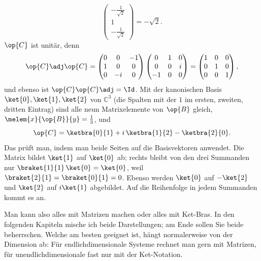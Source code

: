 \begin{example}
\begin{equation}
      \begin{pmatrix} -\frac{1}{\sqrt{2}} \\ 1 \\ -\frac{1}{\sqrt{2}} \end{pmatrix}
    = -\sqrt{2} .
  \end{equation}
  $\op{C}$ ist unitär, denn
  \begin{equation}\label{c03.eq.c-unitaer}
    \op{C}\adj\op{C}
    = \begin{pmatrix} 0 & 0 & -1 \\ 1 & 0 & 0 \\ 0 & -i & 0 \end{pmatrix}
      \begin{pmatrix} 0 & 1 & 0 \\ 0 & 0 & i \\ -1 & 0 & 0 \end{pmatrix}
    = \begin{pmatrix} 1 & 0 & 0 \\ 0 & 1 & 0 \\ 0 & 0 & 1 \end{pmatrix} ,
  \end{equation}
  und ebenso ist $\op{C}\op{C}\adj = \Id$. Mit der kanonischen Basis $\ket{0}, \ket{1}, \ket{2}$
  von $\mathbb{C}^3$ (die Spalten mit der $1$ im ersten, zweiten, dritten Eintrag) sind alle
  neun Matrixelemente von $\op{B}$ gleich, $\melem{x}{\op{B}}{y} = \tfrac13$, und
  \begin{equation}\label{c03.eq.c-ketbra}
    \op{C} = \ketbra{0}{1} + i\, \ketbra{1}{2} - \ketbra{2}{0} .
  \end{equation}
  Das prüft man, indem man beide Seiten auf die Basisvektoren anwendet. Die Matrix bildet
  $\ket{1}$ auf $\ket{0}$ ab; rechts bleibt von den drei Summanden nur
  $\braket{1}{1}\, \ket{0} = \ket{0}$, weil $\braket{2}{1} = \braket{0}{1} = 0$. Ebenso werden
  $\ket{0}$ auf $-\ket{2}$ und $\ket{2}$ auf $i\ket{1}$ abgebildet. Auf die Reihenfolge in jedem
  Summanden kommt es an.
\end{example}

Man kann also alles mit Matrizen machen oder alles mit Ket-Bras. In den folgenden Kapiteln
mische ich beide Darstellungen; am Ende sollen Sie beide beherrschen. Welche am besten geeignet
ist, hängt normalerweise von der Dimension ab: Für endlichdimensionale Systeme rechnet man gern
mit Matrizen, für unendlichdimensionale fast nur mit der Ket-Notation.

